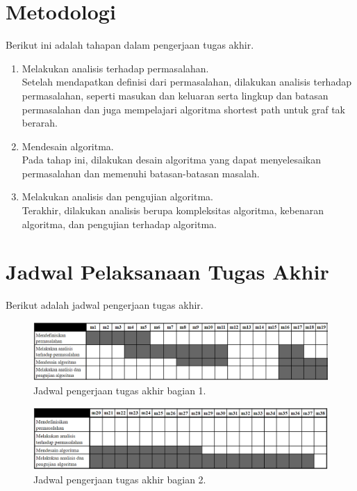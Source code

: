 \section{Metodologi}

Berikut ini adalah tahapan dalam pengerjaan tugas akhir.

\begin{enumerate}
  \item Melakukan analisis terhadap permasalahan.\\
  Setelah mendapatkan definisi dari permasalahan, dilakukan analisis terhadap permasalahan, seperti masukan dan keluaran serta lingkup dan batasan permasalahan dan juga mempelajari algoritma shortest path untuk graf tak berarah.
  \item Mendesain algoritma.\\
  Pada tahap ini, dilakukan desain algoritma yang dapat menyelesaikan permasalahan dan memenuhi batasan-batasan masalah.
  \item Melakukan analisis dan pengujian algoritma.\\
  Terakhir, dilakukan analisis berupa kompleksitas algoritma, kebenaran algoritma, dan pengujian terhadap algoritma.
\end{enumerate}

\section{Jadwal Pelaksanaan Tugas Akhir}

Berikut adalah jadwal pengerjaan tugas akhir.

\begin{figure}[H]
  \centering
  \includegraphics[width=1.0\textwidth]{resources/jadwal1.png}
  \caption{Jadwal pengerjaan tugas akhir bagian 1.}
\end{figure}

\begin{figure}[H]
  \centering
  \includegraphics[width=1.0\textwidth]{resources/jadwal2.png}
  \caption{Jadwal pengerjaan tugas akhir bagian 2.}
\end{figure}

